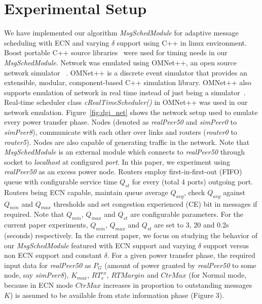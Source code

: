 \section{Experimental Setup}
\label{sec:exp_setup}

We have implemented our algorithm \textit{MsgSchedModule} for adaptive message scheduling with ECN and varying $\delta$ support using C++ in linux environment. Boost portable C++ source libraries~\cite{boost} were used for timing needs in our \textit{MsgSchedModule}. Network was emulated using OMNet++, an open source network simulator ~\cite{omnet, omnetpaper}. OMNet++ is a discrete event simulator that provides an extensible, modular, component-based C++ simulation library. OMNet++ also supports emulation of network in real time instead of just being a simulator~\cite{mayeromnet}. Real-time scheduler class \textit{cRealTimeScheduler()} in OMNet++ was used in our network emulation.
Figure~\ref{fig:dgi_net} shows the network setup used to emulate every power transfer phase. Nodes (denoted as \textit{realPeer50} and \textit{simPeer0} to \textit{simPeer8}), communicate with each other over links and routers (\textit{router0} to \textit{router5}). Nodes are also capable of generating traffic in the network. Note that \textit{MsgSchedModule} is an external module which connects to \textit{realPeer50} through socket to \textit{localhost} at configured \textit{port}. In this paper, we experiment using \textit{realPeer50} as an excess power node. Routers employ first-in-first-out (FIFO) queue with configurable service time $Q_{st}$ for every (total 4 ports) outgoing port. 
Routers being ECN capable, maintain queue average $Q_{avg}$, check $Q_{avg}$ against $Q_{min}$ and $Q_{max}$ thresholds and set congestion experienced (CE) bit in messages if required. Note that $Q_{min}$, $Q_{max}$ and $Q_{st}$ are configurable parameters. 
For the current paper experiments, $Q_{min}$, $Q_{max}$ and $Q_{st}$ are set to 3, 20 and 0.2s (seconds) respectively.
In the current paper, we focus on studying the behavior of our \textit{MsgSchedModule} featured with ECN support and varying $\delta$ support versus non ECN support and constant $\delta$. For a given power transfer phase, the required input data for \textit{realPeer50} as $P_G$ (amount of power granted by \textit{realPeer50} to some node, say \textit{simPeer8}), $K_{max}$, $RT_s^{ex}$, $RTMargin$ and $CtrMax$ (for Normal mode, because in ECN mode $CtrMax$ increases in proportion to outstanding messages $K$) is assumed to be available from state information phase (Figure 3).

